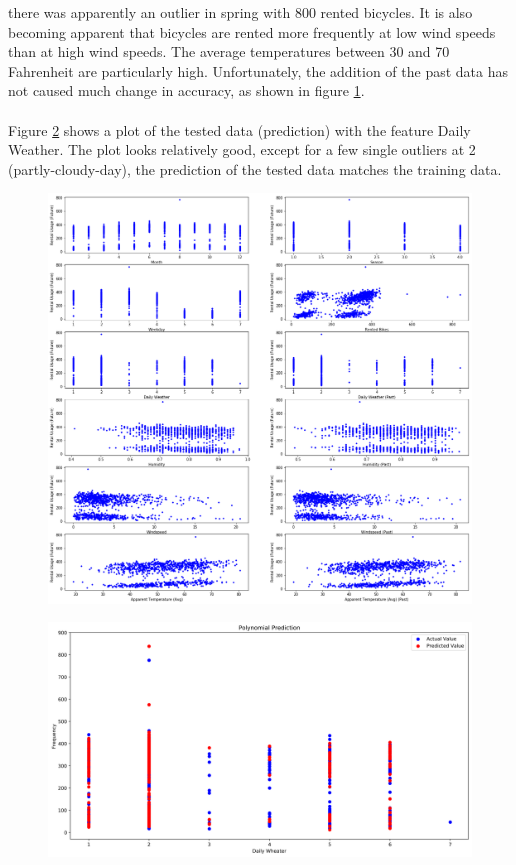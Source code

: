 there was apparently an outlier in spring with 800 rented bicycles. It is also becoming apparent
that bicycles are rented more frequently at low wind speeds than at high wind speeds. The average
temperatures between 30 and 70 Fahrenheit are particularly high. Unfortunately, the addition of
the past data has not caused much change in accuracy, as shown in figure \ref{fig:figure9_polynomial_features}.\\\\
Figure \ref{fig:figure10_polynomial_prediction} shows a plot of the tested data (prediction) with the feature \glqq Daily Weather\grqq . The plot looks relatively good, except for a few single outliers at 2 (partly-cloudy-day), the prediction of the
tested data matches the training data.
\begin{figure}[H]
\hspace{-2.8cm}
\includegraphics[width=1.4\textwidth]{img/figure9_polynomial_features}\label{fig:figure9_polynomial_features}
\label{fig:figure9_polynomial_features}
\end{figure}
\begin{figure}[H]
\hspace{-2.4cm}
\includegraphics[width=1.3\textwidth]{img/figure10_polynomial_prediction}\label{fig:figure10_polynomial_prediction}
\label{fig:figure10_polynomial_prediction}
\end{figure}